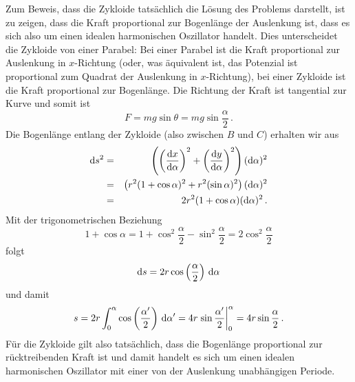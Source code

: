 Zum Beweis, dass die Zykloide tats\"achlich  die L\"osung des Problems darstellt, ist zu zeigen, dass die
Kraft proportional zur Bogenl\"ange der Auslenkung ist, dass es sich also um einen idealen harmonischen Oszillator
handelt. Dies unterscheidet die Zykloide von einer Parabel: Bei einer Parabel ist die Kraft proportional
zur Auslenkung in $x$-Richtung (oder, was \"aquivalent ist, das Potenzial ist proportional zum Quadrat der 
Auslenkung in $x$-Richtung), bei einer Zykloide ist die Kraft proportional zur Bogenl\"ange. Die Richtung der 
Kraft ist tangential zur Kurve und somit ist 
\begin{equation}
        F=mg \sin \theta=mg \sin \frac{\alpha}{2} \, .
\end{equation} 
Die Bogenl\"ange entlang der Zykloide (also zwischen $B$ und $C$) erhalten wir aus
\begin{eqnarray}
   {\rm d}s^2 &=& \left( \left( \frac{{\rm d} x}{{\rm d}\alpha} \right)^2 + \left( \frac{{\rm d} y}{{\rm d}\alpha} \right)^2 \right) 
                                     ({\rm d}\alpha)^2 \\ 
       &=&  \left( r^2 (1 + \cos \alpha)^2 + r^2 (\sin \alpha)^2 \right) ({\rm d}\alpha )^2 \\
       &=&   2 r^2 ( 1 + \cos \alpha) ({\rm d}\alpha )^2 \, .
\end{eqnarray}
Mit der trigonometrischen Beziehung
\begin{equation}
   1 + \cos \alpha = 1 + \cos^2 \frac{\alpha}{2} - \sin^2 \frac{\alpha}{2} = 2 \cos^2 \frac{\alpha}{2} 
\end{equation}
folgt
\begin{equation}
      {\rm d}s = 2r \cos \left( \frac{\alpha}{2} \right) \,  {\rm d} \alpha 
\end{equation}
und damit
\begin{equation}
      s = 2 r \int_0^\alpha \cos \left( \frac{\alpha'}{2} \right) \,  {\rm d} \alpha' = 
            4r  \left. \sin \frac{\alpha'}{2} \right|_0^\alpha = 4r \sin \frac{\alpha}{2}   \, .
\end{equation}
F\"ur die Zykloide gilt also tats\"achlich, dass die Bogenl\"ange proportional zur r\"ucktreibenden
Kraft ist und damit handelt es sich um einen idealen harmonischen Oszillator mit einer von der
Auslenkung unabh\"angigen Periode. 

